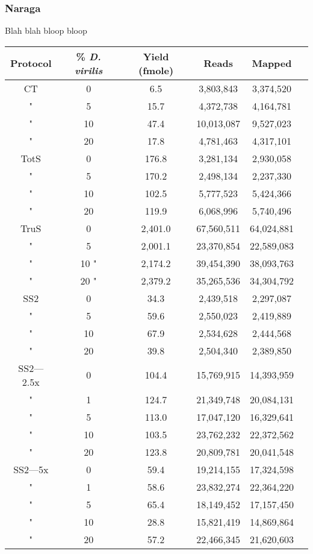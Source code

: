 \subsubsection{Naraga}
Blah blah bloop bloop



\begin{table}[htdp]
\begin{center}
\begin{tabular}{|c|c|c|c|c|c|} \hline
Protocol & \% {\em D. virilis}  &  Yield (fmole) & Reads & Mapped \\\hline 
CT & 0  & 6.5  & 3,803,843 &3,374,520 \\
" &  5 & 15.7  & 4,372,738 &4,164,781 \\
" & 10 & 47.4  & 10,013,087 &9,527,023 \\
" & 20 & 17.8  & 4,781,463 &4,317,101 \\
TotS & 0  & 176.8  & 3,281,134 &2,930,058 \\
" &  5  & 170.2  & 2,498,134 &2,237,330 \\
" & 10  & 102.5  & 5,777,523 &5,424,366 \\
" & 20  & 119.9  & 6,068,996 &5,740,496 \\
TruS & 0  & 2,401.0  & 67,560,511 &64,024,881 \\
" &  5  & 2,001.1  & 23,370,854 &22,589,083 \\
" & 10 " & 2,174.2  & 39,454,390 &38,093,763 \\
" & 20 " & 2,379.2  & 35,265,536 &34,304,792 \\
SS2 & 0 & 34.3  & 2,439,518 &2,297,087 \\
" &  5 & 59.6  & 2,550,023 &2,419,889 \\
" & 10 & 67.9  & 2,534,628 &2,444,568 \\
" & 20 & 39.8  & 2,504,340 &2,389,850 \\
SS2---2.5x & 0 & 104.4  & 15,769,915 &14,393,959 \\
" &  1 & 124.7  & 21,349,748 &20,084,131 \\
" &  5 & 113.0  & 17,047,120 &16,329,641 \\
" & 10 & 103.5  & 23,762,232 &22,372,562 \\
" & 20 & 123.8  & 20,809,781 &20,041,548 \\
SS2---5x & 0 & 59.4  & 19,214,155 &17,324,598 \\
" &  1 & 58.6  & 23,832,274 &22,364,220 \\
" &  5 & 65.4  & 18,149,452 &17,157,450 \\
" & 10 & 28.8  & 15,821,419 &14,869,864 \\
" & 20 & 57.2  & 22,466,345 &21,620,603 \\
\hline
\end{tabular}
\label{tab:protocols}
\end{center}
\end{table}
      
